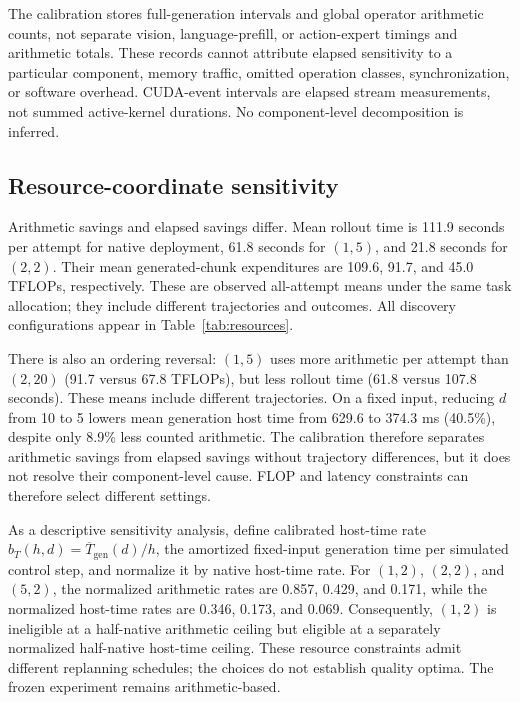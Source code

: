 \documentclass{article}
\begin{document}
The calibration stores full-generation intervals and global operator arithmetic
counts, not separate vision, language-prefill, or action-expert timings and
arithmetic totals. These records cannot attribute elapsed sensitivity to a
particular component, memory traffic, omitted operation classes, synchronization,
or software overhead. CUDA-event intervals are elapsed stream measurements,
not summed active-kernel durations. No component-level decomposition is inferred.

\subsection{Resource-coordinate sensitivity}
\label{app:timing-sensitivity}

Arithmetic savings and elapsed savings differ. Mean rollout time is 111.9 seconds
per attempt for native deployment, 61.8 seconds for $(1,5)$, and 21.8 seconds for
$(2,2)$. Their mean generated-chunk expenditures are 109.6, 91.7, and 45.0 TFLOPs,
respectively. These are observed all-attempt means under the same task allocation;
they include different trajectories and outcomes. All discovery configurations
appear in Table~\ref{tab:resources}.

There is also an ordering reversal: $(1,5)$ uses more arithmetic per attempt
than $(2,20)$ (91.7 versus 67.8 TFLOPs), but less rollout time (61.8 versus
107.8 seconds). These means include different trajectories. On a fixed input,
reducing $d$ from 10 to 5 lowers mean generation host time from 629.6 to
374.3 ms (40.5\%), despite only 8.9\% less counted arithmetic. The calibration
therefore separates arithmetic savings from elapsed savings without trajectory
differences, but it does not resolve their component-level cause. FLOP and
latency constraints can therefore select different settings.

As a descriptive sensitivity analysis, define calibrated host-time rate
$b_T(h,d)=\overline{T}_{\mathrm{gen}}(d)/h$, the amortized fixed-input generation
time per simulated control step, and normalize it by native host-time rate.
For $(1,2)$, $(2,2)$, and $(5,2)$, the normalized arithmetic rates are
0.857, 0.429, and 0.171, while the normalized host-time rates are 0.346, 0.173,
and 0.069. Consequently, $(1,2)$ is ineligible at a half-native arithmetic
ceiling but eligible at a separately normalized half-native host-time ceiling.
These resource constraints admit different replanning schedules; the choices do
not establish quality optima. The frozen experiment remains arithmetic-based.
\end{document}
